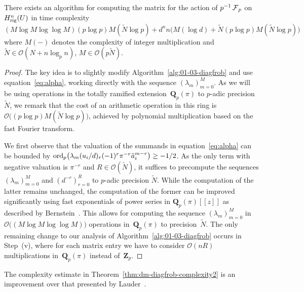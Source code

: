 \begin{thm} \label{thm:dm-diagfrob-complexity2}
There exists an algorithm for computing the matrix for the 
action of $p^{-1} \operatorname{\mathcal{F}}_p$ on $H_{\text{rig}}^{n}(U)$ in time complexity 
\begin{equation*}
(M \log M \log \log M) (p \log p) M(\tilde{N} \log p) 
+ d^n n \bigl( M(\log d) 
              + \tilde{N} (p \log p) M(\tilde{N} \log p) \bigr)
\end{equation*}
where $M(-)$ denotes the complexity of integer multiplication 
and $\tilde{N} \in \mathcal{O}(N + n \log_p n)$, 
$M \in \mathcal{O}(p \tilde{N})$.
\end{thm}

\begin{proof}
The key idea is to slightly modify Algorithm~\ref{alg:01-03-diagfrob} 
and use equation~\eqref{eq:alpha}, working directly with the sequence 
$(\lambda_m)_{m=0}^{M}$.  As we will be using operations in the 
totally ramified extension~$\mathbf{Q}_p(\pi)$ to 
$p$-adic precision~$\tilde{N}$, we remark that the cost of 
an arithmetic operation in this ring is 
$\mathcal{O}\bigl((p \log p) M(\tilde{N} \log p)\bigr)$, 
achieved by polynomial multiplication based on the fast Fourier 
transform.

We first observe that the valuation of the summands in 
equation~\eqref{eq:alpha} can be bounded by 
$\operatorname{ord}_p \bigl(\lambda_m (u_i / d)_r (-1)^r \pi^{-r} {\hat{a}_i}^{m-r} \bigr) \geq - 1/2$.
As the only term with negative valuation is $\pi^{-r}$ and 
$R \in \mathcal{O}(\tilde{N})$, it suffices to precompute 
the sequences $(\lambda_m)_{m=0}^{M}$ and $(d^{-r})_{r=0}^{R}$ 
to $p$-adic precision $\tilde{N}$.  While the computation 
of the latter remains unchanged, the computation of the former 
can be improved significantly using fast exponentials of 
power series in $\mathbf{Q}_p(\pi)[[z]]$ as described by 
Bernstein~\citep[\S 9.3]{Bernstein2008}.  This allows for 
computing the sequence $(\lambda_m)_{m=0}^{M}$ in 
$\mathcal{O}\bigl( (M \log M \log \log M) \bigr)$ operations 
in~$\mathbf{Q}_p(\pi)$ to precision~$\tilde{N}$.  The only 
remaining change to our analysis of Algorithm~\ref{alg:01-03-diagfrob} 
occurs in {Step~(v)}, where for each matrix entry we have to consider 
$\mathcal{O}(n R)$ multiplications in~$\mathbf{Q}_p(\pi)$ instead 
of~$\mathbf{Z}_p$.
\end{proof}

\begin{rem}
The complexity estimate in Theorem~\ref{thm:dm-diagfrob-complexity2} 
is an improvement over that presented by Lauder~\citep[\S 10]{Lau04a}.
\end{rem}


